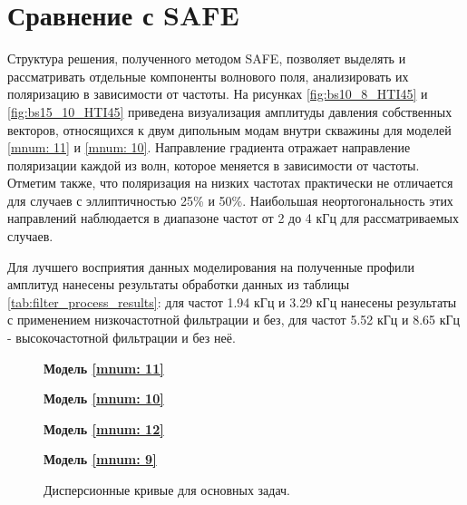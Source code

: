 \documentclass[a4paper,11pt]{article}
\begin{document}
\section{Сравнение с SAFE}

Структура решения, полученного методом SAFE, позволяет выделять и рассматривать отдельные компоненты волнового поля, анализировать их поляризацию в зависимости от частоты. На рисунках \ref{fig:bs10_8_HTI45} и \ref{fig:bs15_10_HTI45} приведена визуализация амплитуды давления собственных векторов, относящихся к двум дипольным модам внутри скважины для моделей \ref{mnum: 11} и \ref{mnum: 10}. Направление градиента отражает направление поляризации каждой из волн, которое меняется в зависимости от частоты. Отметим также, что поляризация на низких частотах практически не отличается для случаев с эллиптичностью 25\% и 50\%. Наибольшая неортогональность этих направлений наблюдается в диапазоне частот от 2 до 4 кГц для рассматриваемых случаев. 

Для лучшего восприятия данных моделирования на полученные профили амплитуд нанесены результаты обработки данных из таблицы \ref{tab:filter_process_results}: для частот 1.94 кГц и 3.29 кГц нанесены результаты с применением низкочастотной фильтрации и без, для частот 5.52 кГц и 8.65 кГц - высокочастотной фильтрации и без неё. 

\begin{figure}[h]
\centering
\begin{minipage}{0.49\linewidth}
	\centering \textbf{Модель \ref{mnum: 11}}
	 \\
\end{minipage}
\begin{minipage}{0.49\linewidth}
	\centering \textbf{Модель \ref{mnum: 10}}
	 \\
\end{minipage}
\begin{minipage}{0.49\linewidth}
	\centering \textbf{Модель \ref{mnum: 12}}
	 \\
\end{minipage}
\begin{minipage}{0.49\linewidth}
	\centering \textbf{Модель \ref{mnum: 9}}
	 \\
\end{minipage}
\caption{Дисперсионные кривые для основных задач. }
\label{fig:disp_curves_all}
\end{figure}
\end{document}
